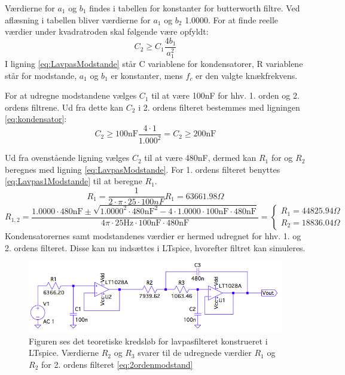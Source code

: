\noindent Værdierne for $a_{1}$ og $b_{1}$ findes i tabellen for konstanter for butterworth filtre. Ved aflæsning i tabellen bliver værdierne for $a_{1}$  og  $b_{2}$ 1.0000. For at finde reelle værdier under kvadratroden skal følgende være opfyldt:
\begin{equation} \label{eq:kondensator}
C_2 \geq C_1 \frac{4b_1}{a_1^2}
\end{equation}
I ligning \ref{eq:LavpasModstande} står C variablene for kondensatorer, R variablene står for modstande, $a_1$ og $b_1$ er konstanter, mens $f_c$ er den valgte knækfrekvens. 

\noindent For at udregne modstandene vælges $C_1$ til at være 100nF for hhv. 1. orden og 2. ordens filtrene. Ud fra dette kan $C_2$ i 2. ordens filteret bestemmes med ligningen \ref{eq:kondensator}:
\begin{equation} 
C_2 \geq 100\text{nF} \frac{4\cdot 1}{1.000^2} = C_2 \geq 200\text{nF}
\end{equation}

\noindent Ud fra ovenstående ligning vælges $C_2$ til at være 480nF, dermed kan $R_1$ for og $R_2$ beregnes med ligning \ref{eq:LavpasModstande}. For 1. ordens filteret benyttes \ref{eq:Lavpas1Modstande} til at beregne $R_1$.
\begin{equation} \label{eq:Lavpas1Modstande}
R_{1} = \frac{1}{2 \cdot \pi \cdot 25 \cdot 100nF} R_{1} = 63661.98 \Omega
\end{equation}
\begin{equation} \label{eq:2ordenmodstand}
R_{1,2} = \frac{1.0000 \cdot 480\text{nF} \pm \sqrt{1.0000^2 \cdot 480\text{nF}^2 - 4 \cdot 1.0000 \cdot 100\text{nF} \cdot 480\text{nF}}}{4 \pi \cdot 25\text{Hz} \cdot 100\text{nF} \cdot 480\text{nF}} = \begin{cases} R_{1} =  44825.94\Omega \\ R_{2} = 18836.04 \Omega \end{cases}
\end{equation}
\noindent Kondensatorernes samt modstandenes værdier er hermed udregnet for hhv. 1. og 2. ordens filteret. Disse kan nu indsættes i LTspice, hvorefter filtret kan simuleres. 

\begin{figure}[H]
	\centering
	\includegraphics[scale=0.58]{figures/cProblemloesning/Lavpasfilter1_LTspice.PNG}
	\caption{Figuren ses det teoretiske kredsløb for lavpasfilteret konstrueret i LTspice. Værdierne $R_{2}$ og $R_{3}$ svarer til de udregnede værdier $R_{1}$ og $R_{2}$ for 2. ordens filteret \ref{eq:2ordenmodstand}}
	\label{fig:lavpasfilter1_LTspice}
\end{figure}

